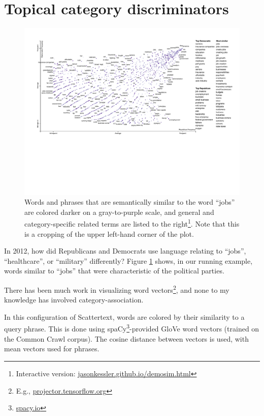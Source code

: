 \documentclass[11pt,a4paper]{article}
\begin{document}
\section{Topical category discriminators}
\begin{figure}[h]
  \includegraphics[width=\linewidth]{similarity_scattertext_portion}
  \caption{Words and phrases that are semantically similar to the word ``jobs'' are colored darker on a gray-to-purple scale, and general and category-specific related terms are listed to the right\footnote{Interactive version: \href{https://jasonkessler.github.io/demosim.html}{jasonkessler.github.io/demosim.html}}.  Note that this is a cropping of the upper left-hand corner of the plot.}
  \label{scattertextembeddings}
\end{figure}
\label{embeddings}
In 2012, how did Republicans and Democrats use language relating to ``jobs'', ``healthcare'', or ``military'' differently?   Figure \ref{scattertextembeddings} shows, in our running example, words similar to ``jobs'' that were characteristic of the political parties.  

There has been much work in visualizing word vectors\footnote{E.g., \href{http://projector.tensorflow.org/}{projector.tensorflow.org}}, and none to my knowledge has involved category-association.

In this configuration of Scattertext, words are colored by their similarity to a query phrase.  This is done using spaCy\footnote{\href{https://spacy.io/}{spacy.io}}-provided GloVe \cite{glove} word vectors (trained on the Common Crawl corpus). The cosine distance between vectors is used, with mean vectors used for phrases.
\end{document}

